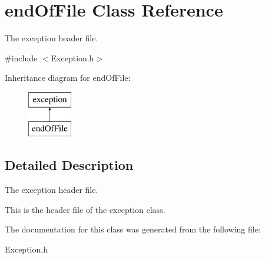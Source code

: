 \hypertarget{classend_of_file}{\section{end\-Of\-File Class Reference}
\label{classend_of_file}
}


The exception header file.  




{\ttfamily \#include $<$Exception.\-h$>$}

Inheritance diagram for end\-Of\-File\-:\begin{figure}[H]
\begin{center}
\leavevmode
\includegraphics[height=2.000000cm]{classend_of_file}
\end{center}
\end{figure}


\subsection{Detailed Description}
The exception header file. 

This is the header file of the exception class. 

The documentation for this class was generated from the following file\-:\begin{DoxyCompactItemize}
\item 
Exception.\-h\end{DoxyCompactItemize}
